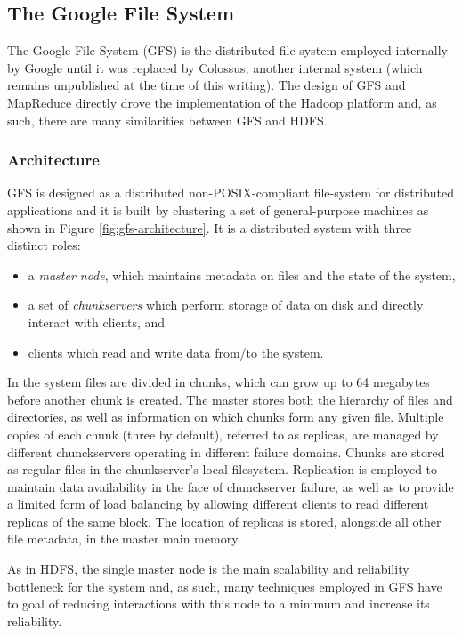\subsection{The Google File System}
The Google File System (GFS) \cite{DBLP:conf/sosp/GhemawatGL03} is the distributed file-system employed internally by Google until it was replaced by Colossus, another internal system (which remains unpublished at the time of this writing). 
The design of GFS and MapReduce \cite{DBLP:journals/cacm/DeanG08} directly drove the implementation of the Hadoop platform and, as such, there are many similarities between GFS and HDFS.

\subsubsection{Architecture}
GFS is designed as a distributed non-POSIX-compliant file-system for distributed applications and it is built by clustering a set of general-purpose machines as shown in Figure \ref{fig:gfs-architecture}.
It is a distributed system with three distinct roles: 
\begin{itemize}
    \item a \emph{master node}, which maintains metadata on files and the state of the system,
    \item a set of \emph{chunkservers} which perform storage of data on disk and directly interact with clients, and
    \item clients which read and write data from/to the system.
\end{itemize}
In the system files are divided in chunks, which can grow up to 64 megabytes before another chunk is created.
The master stores both the hierarchy of files and directories, as well as information on which chunks form any given file.
Multiple copies of each chunk (three by default), referred to as replicas, are managed by different chunckservers operating in different failure domains.
Chunks are stored as regular files in the chunkserver's local filesystem.
Replication is employed to maintain data availability in the face of chunckserver failure, as well as to provide a limited form of load balancing by allowing different clients to read different replicas of the same block.
The location of replicas is stored, alongside all other file metadata, in the master main memory.

As in HDFS, the single master node is the main scalability and reliability bottleneck for the system and, as such, many techniques employed in GFS have to goal of reducing interactions with this node to a minimum and increase its reliability.
